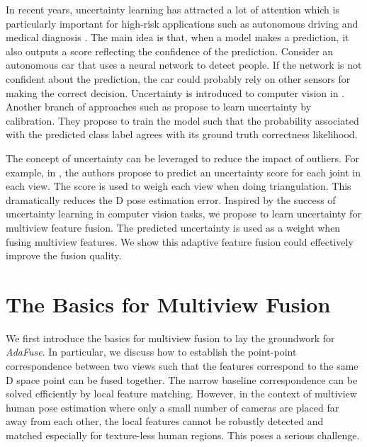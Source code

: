In recent years, uncertainty learning \citep{kendall2017uncertainties,gal2015dropout,lakshminarayanan2017simple,zafar2019face,lakshminarayanan2017simple,pleiss2017fairness} has attracted a lot of attention which is particularly important for high-risk applications such as autonomous driving and medical diagnosis \citep{gal2016uncertainty,ghahramani2016history}. The main idea is that, when a model makes a prediction, it also outputs a score reflecting the confidence of the prediction. Consider an autonomous car that uses a neural network to detect people. If the network is not confident about the prediction, the car could probably rely on other sensors for making the correct decision.
Uncertainty is introduced to computer vision in \citep{kendall2017uncertainties,kreiss2019pifpaf,he2019bounding,ilg2018uncertainty}. Another branch of approaches such as \citep{guo2017calibration,pleiss2017fairness} propose to learn uncertainty by calibration. They propose to train the model such that the probability associated with the predicted class label agrees with its ground truth correctness likelihood. 

The concept of uncertainty can be leveraged to reduce the impact of outliers. For example, in \citep{iskakov2019learnable}, the authors propose to predict an uncertainty score for each joint in each view. The score is used to weigh each view when doing triangulation. This dramatically reduces the D pose estimation error. Inspired by the success of uncertainty learning in computer vision tasks, we propose to learn uncertainty for multiview feature fusion. The predicted uncertainty is used as a weight when fusing multiview features.  We show this adaptive feature fusion could effectively improve the fusion quality.




\section{The Basics for Multiview Fusion}
\label{sec:efl}

We first introduce the basics for multiview fusion to lay the groundwork for \emph{AdaFuse}. In particular, we discuss how to establish the point-point correspondence between two views such that the features correspond to the same D space point can be fused together. The narrow baseline correspondence can be solved efficiently by local feature matching. However, in the context of multiview human pose estimation where only a small number of cameras are placed far away from each other, the local features cannot be robustly detected and matched especially for texture-less human regions. This poses a serious challenge.


